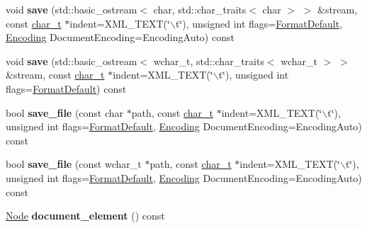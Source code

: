 \begin{DoxyCompactItemize}
\item 
\hypertarget{classphys_1_1xml_1_1Document_a7b59dab683101ad4374b8b9009dbec4a}{
void {\bfseries save} (std::basic\_\-ostream$<$ char, std::char\_\-traits$<$ char $>$ $>$ \&stream, const \hyperlink{namespacephys_1_1xml_afc87705cd1c2917d87b879715a2d8f6e}{char\_\-t} $\ast$indent=XML\_\-TEXT(\char`\"{}$\backslash$t\char`\"{}), unsigned int flags=\hyperlink{namespacephys_1_1xml_a08bf6aab51f79929d9097706a5e64408}{FormatDefault}, \hyperlink{namespacephys_1_1xml_a420f5de782438f88160321385bea2015}{Encoding} DocumentEncoding=EncodingAuto) const }
\label{dd/d44/classphys_1_1xml_1_1Document_a7b59dab683101ad4374b8b9009dbec4a}

\item 
\hypertarget{classphys_1_1xml_1_1Document_ab0b68aaf634ec540815f6ea99da15d58}{
void {\bfseries save} (std::basic\_\-ostream$<$ wchar\_\-t, std::char\_\-traits$<$ wchar\_\-t $>$ $>$ \&stream, const \hyperlink{namespacephys_1_1xml_afc87705cd1c2917d87b879715a2d8f6e}{char\_\-t} $\ast$indent=XML\_\-TEXT(\char`\"{}$\backslash$t\char`\"{}), unsigned int flags=\hyperlink{namespacephys_1_1xml_a08bf6aab51f79929d9097706a5e64408}{FormatDefault}) const }
\label{dd/d44/classphys_1_1xml_1_1Document_ab0b68aaf634ec540815f6ea99da15d58}

\item 
\hypertarget{classphys_1_1xml_1_1Document_a733a41e829fb573c649b214125b33445}{
bool {\bfseries save\_\-file} (const char $\ast$path, const \hyperlink{namespacephys_1_1xml_afc87705cd1c2917d87b879715a2d8f6e}{char\_\-t} $\ast$indent=XML\_\-TEXT(\char`\"{}$\backslash$t\char`\"{}), unsigned int flags=\hyperlink{namespacephys_1_1xml_a08bf6aab51f79929d9097706a5e64408}{FormatDefault}, \hyperlink{namespacephys_1_1xml_a420f5de782438f88160321385bea2015}{Encoding} DocumentEncoding=EncodingAuto) const }
\label{dd/d44/classphys_1_1xml_1_1Document_a733a41e829fb573c649b214125b33445}

\item 
\hypertarget{classphys_1_1xml_1_1Document_a7eff3072bf3e87b40b1d6906eb5baf17}{
bool {\bfseries save\_\-file} (const wchar\_\-t $\ast$path, const \hyperlink{namespacephys_1_1xml_afc87705cd1c2917d87b879715a2d8f6e}{char\_\-t} $\ast$indent=XML\_\-TEXT(\char`\"{}$\backslash$t\char`\"{}), unsigned int flags=\hyperlink{namespacephys_1_1xml_a08bf6aab51f79929d9097706a5e64408}{FormatDefault}, \hyperlink{namespacephys_1_1xml_a420f5de782438f88160321385bea2015}{Encoding} DocumentEncoding=EncodingAuto) const }
\label{dd/d44/classphys_1_1xml_1_1Document_a7eff3072bf3e87b40b1d6906eb5baf17}

\item 
\hypertarget{classphys_1_1xml_1_1Document_a481cbf277cfe6d6daf1b66f8d862b88e}{
\hyperlink{classphys_1_1xml_1_1Node}{Node} {\bfseries document\_\-element} () const }
\label{dd/d44/classphys_1_1xml_1_1Document_a481cbf277cfe6d6daf1b66f8d862b88e}

\end{DoxyCompactItemize}


